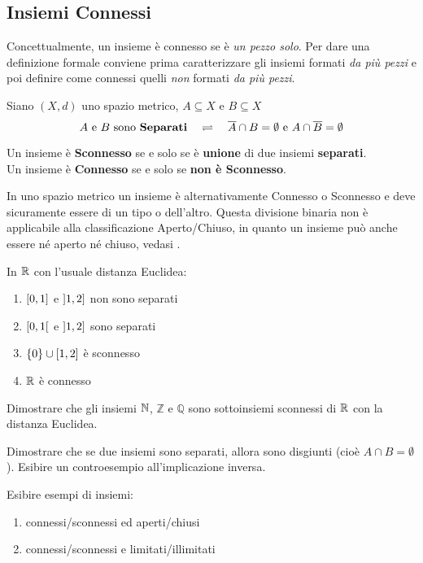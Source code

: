 \subsection{Insiemi Connessi}
Concettualmente, un insieme è connesso se è \textit{un pezzo solo}. Per dare una definizione formale conviene prima caratterizzare gli insiemi formati \textit{da più pezzi} e poi definire come connessi quelli \textit{non} formati \textit{da più pezzi}.
\begin{definition}
	Siano $(X,d)$ uno spazio metrico, $A \subseteq X$ e $B \subseteq X$
	\[A \text{ e } B \text{ sono \textbf{Separati}} \quad \rightleftharpoons \quad \overline{A} \cap B = \emptyset \text{ e } A \cap \overline{B} = \emptyset\]
\end{definition}
\begin{definition}
	\label{def:connesso}
	Un insieme è \textbf{Sconnesso} se e solo se è \textbf{unione} di due insiemi \textbf{separati}.\\
	Un insieme è \textbf{Connesso} se e solo se \textbf{non è Sconnesso}.
	\begin{note}
		In uno spazio metrico un insieme è alternativamente Connesso o Sconnesso e deve sicuramente essere di un tipo o dell'altro. Questa divisione binaria non è applicabile alla classificazione Aperto/Chiuso, in quanto un insieme può anche essere né aperto né chiuso, vedasi .
	\end{note}
\end{definition}
\begin{example}
	In $\mathbb{R}$ con l'usuale distanza Euclidea:
	\begin{enumerate}
		\item $\left[0,1\right]$ e $\left]1,2\right]$ non sono separati
		\item $\left[0,1\right[$ e $\left]1,2\right]$ sono separati
		\item $\left\{0\right\} \cup \left[1,2\right]$ è sconnesso
		\item $\mathbb{R}$ è connesso
	\end{enumerate}
\end{example}
\begin{exercise}
	Dimostrare che gli insiemi $\mathbb{N}$, $\mathbb{Z}$ e $\mathbb{Q}$ sono sottoinsiemi sconnessi di $\mathbb{R}$ con la distanza Euclidea.
\end{exercise}
\begin{exercise}
	Dimostrare che se due insiemi sono separati, allora sono disgiunti (cioè $A \cap B = \emptyset$). Esibire un controesempio all'implicazione inversa.
\end{exercise}
\begin{exercise}
	Esibire esempi di insiemi:
	\begin{enumerate}
		\item connessi/sconnessi ed aperti/chiusi
		\item connessi/sconnessi e limitati/illimitati
	\end{enumerate}
\end{exercise}


